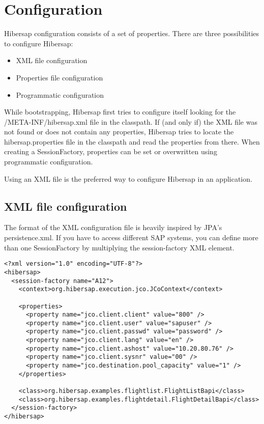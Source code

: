 \chapter{Configuration}
\label{cha:Configuration}

Hibersap configuration consists of a set of properties. 
There are three possibilities to configure Hibersap: 
\begin{itemize}
  \item XML file configuration 
  \item Properties file configuration 
  \item Programmatic configuration
\end{itemize}

While bootstrapping, Hibersap first tries to configure itself looking for the /META-INF/hibersap.xml file in the
classpath. If (and only if) the XML file was not found or does not contain any properties, Hibersap tries to locate the
hibersap.properties file in the classpath and read the properties from there. When creating a SessionFactory,
properties can be set or overwritten using programmatic configuration.


Using an XML file is the preferred way to configure Hibersap in an application.





\section{XML file configuration}

The format of the XML configuration file is heavily inspired by JPA's persistence.xml.
If you have to access different SAP systems, you can define more than one SessionFactory by multiplying the
session-factory XML element.

\begin{Verbatim}[frame=single,label=hibersap.xml]
<?xml version="1.0" encoding="UTF-8"?>
<hibersap>
  <session-factory name="A12">
    <context>org.hibersap.execution.jco.JCoContext</context>

    <properties>
      <property name="jco.client.client" value="800" />
      <property name="jco.client.user" value="sapuser" />
      <property name="jco.client.passwd" value="password" />
      <property name="jco.client.lang" value="en" />
      <property name="jco.client.ashost" value="10.20.80.76" />
      <property name="jco.client.sysnr" value="00" />
      <property name="jco.destination.pool_capacity" value="1" />
    </properties>

    <class>org.hibersap.examples.flightlist.FlightListBapi</class>
    <class>org.hibersap.examples.flightdetail.FlightDetailBapi</class>
  </session-factory>
</hibersap>
\end{Verbatim}

